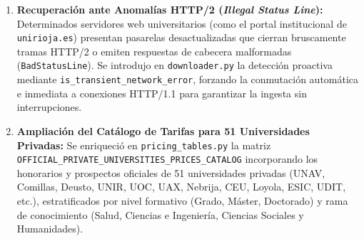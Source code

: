 \begin{enumerate}
    \item \textbf{Recuperación ante Anomalías HTTP/2 (\emph{Illegal Status Line}):} Determinados servidores web universitarios (como el portal institucional de \texttt{unirioja.es}) presentan pasarelas desactualizadas que cierran bruscamente tramas HTTP/2 o emiten respuestas de cabecera malformadas (\texttt{BadStatusLine}). Se introdujo en \texttt{downloader.py} la detección proactiva mediante \texttt{is\_transient\_network\_error}, forzando la conmutación automática e inmediata a conexiones HTTP/1.1 para garantizar la ingesta sin interrupciones.
    \item \textbf{Ampliación del Catálogo de Tarifas para 51 Universidades Privadas:} Se enriqueció en \texttt{pricing\_tables.py} la matriz \texttt{OFFICIAL\_PRIVATE\_UNIVERSITIES\_PRICES\_CATALOG} incorporando los honorarios y prospectos oficiales de 51 universidades privadas (UNAV, Comillas, Deusto, UNIR, UOC, UAX, Nebrija, CEU, Loyola, ESIC, UDIT, etc.), estratificados por nivel formativo (Grado, Máster, Doctorado) y rama de conocimiento (Salud, Ciencias e Ingeniería, Ciencias Sociales y Humanidades).
\end{enumerate}

